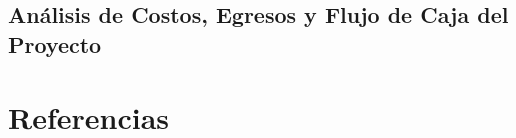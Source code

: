 \documentclass[
titlepage,
oneside,
openright,
onecolumn,
a4paper,
12pt]{book}
\begin{document}
\chapter{Análisis de Costos, Egresos y Flujo de Caja del Proyecto}
\label{anx:analisis-costos-egresos-flujo-caja}




\clearpage
\printglossary[type=\acronymtype,title={Acrónimos}]

\glsaddall
\printglossary[type=main,title={Glosario de Términos}]

\part{Referencias}
\printbibliography[]
\end{document}
